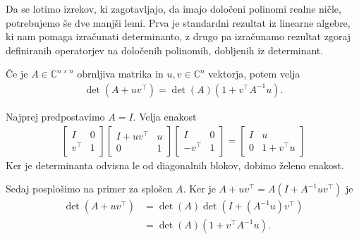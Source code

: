 Da se lotimo izrekov, ki zagotavljajo, da imajo določeni polinomi realne ničle, potrebujemo še dve manjši lemi. Prva je standardni rezultat iz linearne algebre, ki nam pomaga izračunati determinanto\cite{matrix-determinant-lemma}, z drugo pa izračunamo rezultat zgoraj definiranih operatorjev na določenih polinomih, dobljenih iz determinant.
\begin{lema}\label{matrix-det-lemma}
    Če je \(A\in \mathbb C^{n\times n}\) obrnljiva matrika in \(u, v \in \mathbb C^n\) vektorja, potem velja
    \begin{align*}
        \det(A + uv^\top) = \det(A) (1 + v^\top A^{-1} u).
    \end{align*}
\end{lema}
\begin{dokaz}
    Najprej predpostavimo \(A=I\). Velja enakost
    \begin{align*}
        \begin{bmatrix}
            I      & 0 \\
            v^\top & 1
        \end{bmatrix}
        \begin{bmatrix}
            I + uv^\top & u \\
            0           & 1
        \end{bmatrix}
        \begin{bmatrix}
            I       & 0 \\
            -v^\top & 1
        \end{bmatrix}
        =
        \begin{bmatrix}
            I & u            \\
            0 & 1 + v^\top u
        \end{bmatrix}
    \end{align*}
    Ker je determinanta odvisna le od diagonalnih blokov, dobimo želeno enakost.

    Sedaj posplošimo na primer za splošen \(A\). Ker je \(A+uv^\top= A(I + A^{-1}uv^\top)\) je
    \begin{align*}
        \det(A + uv^\top) & = \det(A) \det(I + (A^{-1}u)v^\top) \\
                          & = \det(A) (1 + v^\top A^{-1} u).
    \end{align*}
\end{dokaz}

